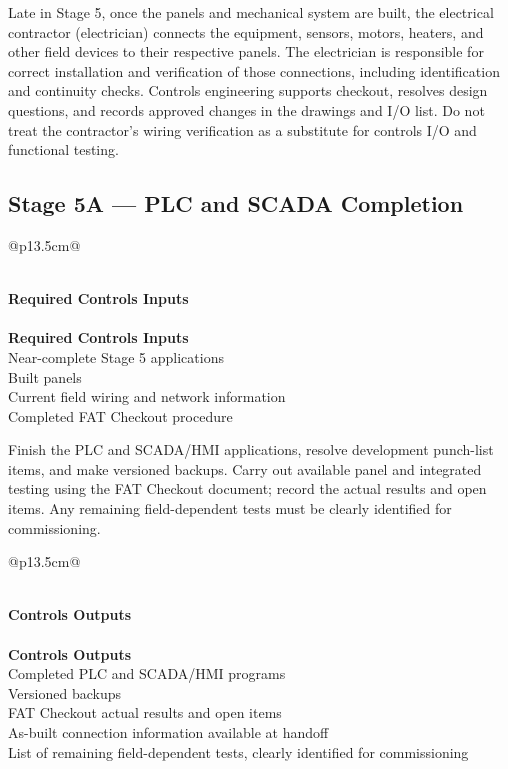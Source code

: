 Late in Stage 5, once the panels and mechanical system are built, the electrical contractor (electrician) connects the equipment, sensors, motors, heaters, and other field devices to their respective panels. The electrician is responsible for correct installation and verification of those connections, including identification and continuity checks. Controls engineering supports checkout, resolves design questions, and records approved changes in the drawings and I/O list. Do not treat the contractor's wiring verification as a substitute for controls I/O and functional testing.

\subsection{Stage 5A --- PLC and SCADA Completion}

\begin{longtable}{@{}p{13.5cm}@{}}
\caption{Stage 5A --- Required Controls Inputs}\label{tab:stage5a-inputs} \\
\toprule
{}\textbf{Required Controls Inputs} \\
\midrule
\endfirsthead
{} \\
\toprule
{}\textbf{Required Controls Inputs} \\
\midrule
\endhead
Near-complete Stage 5 applications \\
Built panels \\
Current field wiring and network information \\
Completed FAT Checkout procedure \\
\bottomrule
\end{longtable}

Finish the PLC and SCADA/HMI applications, resolve development punch-list items, and make versioned backups. Carry out available panel and integrated testing using the FAT Checkout document; record the actual results and open items. Any remaining field-dependent tests must be clearly identified for commissioning.

\begin{longtable}{@{}p{13.5cm}@{}}
\caption{Stage 5A --- Controls Outputs}\label{tab:stage5a-outputs} \\
\toprule
{}\textbf{Controls Outputs} \\
\midrule
\endfirsthead
{} \\
\toprule
{}\textbf{Controls Outputs} \\
\midrule
\endhead
Completed PLC and SCADA/HMI programs \\
Versioned backups \\
FAT Checkout actual results and open items \\
As-built connection information available at handoff \\
List of remaining field-dependent tests, clearly identified for commissioning \\
\bottomrule
\end{longtable}

